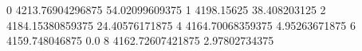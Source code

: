 0 4213.76904296875 54.02099609375
1 4198.15625 38.408203125
2 4184.15380859375 24.40576171875
4 4164.70068359375 4.95263671875
6 4159.748046875 0.0
8 4162.72607421875 2.97802734375
